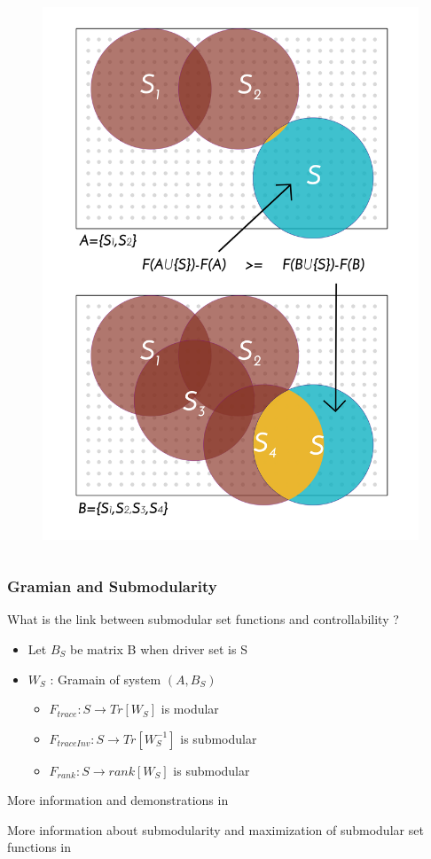 \documentclass[xcolor=dvipsnames]{beamer}
\begin{document}
\begin{frame}
\begin{columns}
\begin{column}{.4\textwidth}
\begin{figure}
				\includegraphics[scale=.25]{figure_1}
			\end{figure}	
		\end{column}
	\end{columns}
\end{frame}

\begin{frame}
	\frametitle{Gramian and Submodularity}

	What is the link between submodular set functions and controllability ?
	\begin{itemize}
		\item Let $B_S$ be matrix B when driver set is S
		\item $W_S $ : Gramain of system $ (A,B_S) $ 	
		\begin{itemize}
			\item $F_{trace}:S \longrightarrow Tr[W_S] $ is modular
			\item $F_{traceInv}:S \longrightarrow Tr[W_S^{-1}] $ is submodular
			\item $F_{rank}:S \longrightarrow rank[W_S] $ is submodular
		\end{itemize}	
	\end{itemize}

	More information and demonstrations in 
	
	More information about submodularity and maximization of submodular set functions in 	
\end{frame}
\end{document}
